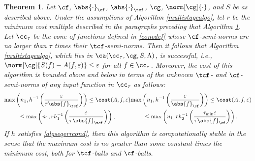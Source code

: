 \documentclass[]{elsarticle}
\newtheorem{theorem}{Theorem}
\theoremstyle{definition}
\theoremstyle{remark}
\newcommand{\Fnorm}[1]{\abs{#1}_{\cf}}
\newcommand{\Ftnorm}[1]{\abs{#1}_{\tcf}}
\newcommand{\Gnorm}[1]{\norm[\cg]{#1}}
\begin{document}
\begin{theorem}  \label{MultiStageThm}  Let $\cf$, $\Fnorm{\cdot}$, $\Ftnorm{\cdot}$, $\cg$, $\Gnorm{\cdot}$, and $S$ be as described above.  Under the assumptions of Algorithm \ref{multistagealgo}, let $r$ be the minimum cost multiple described in the paragraphs preceding that Algorithm \ref{MultiStageThm}.  
Let $\cc_\tau$ be the cone of functions defined in \eqref{conedef} whose $\cf$-semi-norms are no larger than $\tau$ times their $\tcf$-semi-norms.  
Then it follows that Algorithm \ref{multistagealgo}, which lies in $\ca(\cc_{\tau},\cg,S,\Lambda)$, is successful,  i.e.,  $\norm[\cg]{S(f)-A(f,\varepsilon)} \le \varepsilon$ for all $f \in \cc_\tau$.  Moreover, the cost of this algorithm is bounded above and below in terms of the unknown $\tcf$- and $\cf$-semi-norms of any input function in $\cc_{\tau}$ as follows:
\begin{subequations}  \label{automultistagedetcost}
\begin{multline}
\max \left(n_1, h^{-1}\left(\frac{\varepsilon}{\tau \Ftnorm{f}} \right) \right) \le 
\cost(A,f,\varepsilon) \\
\le \max \left(n_1, rh_1^{-1}\left(\frac{\varepsilon}{\tau \Ftnorm{f}} \right) \right),
\end{multline}
\begin{multline}
\max \left(n_1, h^{-1}\left(\frac{\varepsilon}{\Fnorm{f}} \right) \right) \le \cost(A,f,\varepsilon)\\
\le\max \left(n_1, rh_2^{-1}\left(\frac{\tau_{\min}\varepsilon}{\tau \Fnorm{f}} \right) \right).
\end{multline}
\end{subequations}
If $h$ satisfies \eqref{algseqerrcond}, then this algorithm is computationally stable in the sense that the maximum cost is no greater than some constant times the minimum cost, both for $\tcf$-balls and $\cf$-balls.
\end{theorem}
\end{document}
